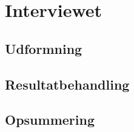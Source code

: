 \section{Interviewet}


\subsection{Udformning}


\subsection{Resultatbehandling}


\subsection{Opsummering}


